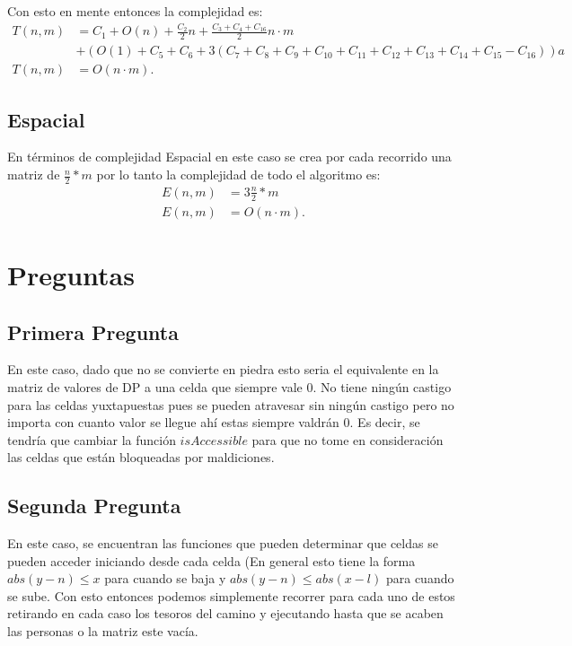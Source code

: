 \documentclass[12pt]{exam}
\begin{document}
Con esto en mente entonces la complejidad es:
\begin{align*}
  T(n, m) &= C_1 + O(n) + \frac{C_2}{2}n + \frac{C_3 + C_4 + C_{16}}{2} n\cdot m \\
	  &+ \left( O\left( 1 \right) + C_5 + C_6 + 3\left( C_7 + C_8 + C_9 + C_{10} + C_{11} + C_{12} + C_{13} + C_{14} + C_{15} - C_{16} \right)\right) a\\
	  T\left( n, m \right) &= O\left( n\cdot m \right) 
.\end{align*}
\subsection{Espacial}
En términos de complejidad Espacial en este caso se crea por cada recorrido una matriz de $\frac{n}{2}*m$ por lo tanto la complejidad de todo el algoritmo es:
\begin{align*}
  E\left( n, m \right) &= 3\frac{n}{2}*m\\
  E\left( n, m \right) &= O\left( n \cdot m \right)
.\end{align*}

\section{Preguntas}
\subsection{Primera Pregunta}

En este caso, dado que no se convierte en piedra esto seria el equivalente en la matriz de valores de DP a una celda que siempre vale 0. No tiene ningún castigo para las celdas yuxtapuestas pues se pueden atravesar sin ningún castigo pero no importa con cuanto valor se llegue ahí estas siempre valdrán 0. Es decir, se tendría que cambiar la función $isAccessible$ para que no tome en consideración las celdas que están bloqueadas por maldiciones.

\subsection{Segunda Pregunta}

En este caso, se encuentran las funciones que pueden determinar que celdas se pueden acceder iniciando desde cada celda (En general esto tiene la forma $abs\left( y - n \right) \le x$ para cuando se baja y $abs\left( y - n \right) \le abs(x - l)$ para cuando se sube. Con esto entonces podemos simplemente recorrer para cada uno de estos retirando en cada caso los tesoros del camino y ejecutando hasta que se acaben las personas o la matriz este vacía.
\end{document}
